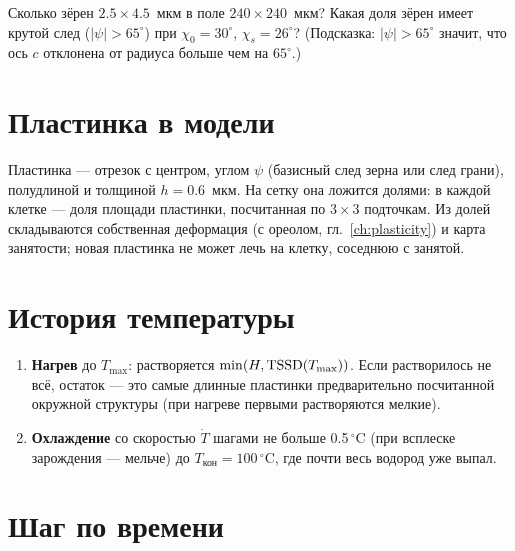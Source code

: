 \begin{exercise}
Сколько зёрен $2.5\times4.5$~мкм в поле $240\times240$~мкм? Какая доля зёрен имеет крутой след
($|\psi|>65^\circ$) при $\chi_0=30^\circ$, $\chi_s=26^\circ$? (Подсказка: $|\psi|>65^\circ$ значит,
что ось $c$ отклонена от радиуса больше чем на $65^\circ$.)
\end{exercise}

\section{Пластинка в модели}

Пластинка --- отрезок с центром, углом $\psi$ (базисный след зерна или след грани), полудлиной
и толщиной $h=0.6$~мкм. На сетку она ложится долями: в каждой клетке --- доля площади пластинки,
посчитанная по $3\times3$ подточкам. Из долей складываются собственная деформация (с ореолом,
гл.~\ref{ch:plasticity}) и карта занятости; новая пластинка не может лечь на клетку, соседнюю
с занятой.

\section{История температуры}

\begin{enumerate}
\item \textbf{Нагрев} до $T_{\max}$: растворяется $\min(H,\mathrm{TSSD}(T_{\max}))$. Если растворилось не всё,
  остаток --- это самые длинные пластинки предварительно посчитанной окружной структуры (при
  нагреве первыми растворяются мелкие).
\item \textbf{Охлаждение} со скоростью $\dot T$ шагами не больше 0.5\,$^\circ$C (при всплеске
  зарождения --- мельче) до $T_{\text{кон}}=100\,^\circ$C, где почти весь водород уже выпал.
\end{enumerate}

\section{Шаг по времени}


